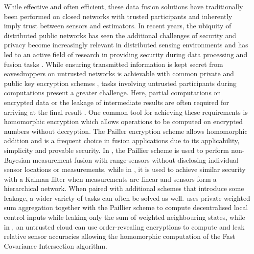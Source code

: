 \documentclass[letterpaper, 10 pt, conference]{ieeeconf}
\begin{document}
While effective and often efficient, these data fusion solutions have traditionally been performed on closed networks with trusted participants and inherently imply trust between sensors and estimators. In recent years, the ubiquity of distributed public networks has seen the additional challenges of security and privacy become increasingly relevant in distributed sensing environments and has led to an active field of research in providing security during data processing and fusion tasks \cite{renSecurityChallengesPublic2012,brennerSecretProgramExecution2011}. While ensuring transmitted information is kept secret from eavesdroppers on untrusted networks is achievable with common private and public key encryption schemes \cite{katzIntroductionModernCryptography2008}, tasks involving untrusted participants during computations present a greater challenge. Here, partial computations on encrypted data or the leakage of intermediate results are often required for arriving at the final result \cite{risticSecureFastCovariance2021,shiPrivacyPreservingAggregationTimeSeries2011}. One common tool for achieving these requirements is homomorphic encryption \cite{gentryFullyHomomorphicEncryption2009,paillierPublicKeyCryptosystemsBased1999} which allows operations to be computed on encrypted numbers without decryption. The Pailler encryption scheme \cite{paillierPublicKeyCryptosystemsBased1999} allows homomorphic addition and is a frequent choice in fusion applications due to its applicability, simplicity and provable security. In \cite{alanwarPrOLocResilientLocalization2017}, the Paillier scheme is used to perform non-Bayesian measurement fusion with range-sensors without disclosing individual sensor locations or measurements, while in \cite{aristovEncryptedMultisensorInformation2018}, it is used to achieve similar security with a Kalman filter when measurements are linear and sensors form a hierarchical network. When paired with additional schemes that introduce some leakage, a wider variety of tasks can often be solved as well. \cite{alexandruEncryptedCooperativeControl2019} uses private weighted sum aggregation together with the Paillier scheme to compute decentralised local control inputs while leaking only the sum of weighted neighbouring states, while in \cite{risticSecureFastCovariance2021}, an untrusted cloud can use order-revealing encryptions to compute and leak relative sensor accuracies allowing the homomorphic computation of the Fast Covariance Intersection algorithm.
\end{document}
